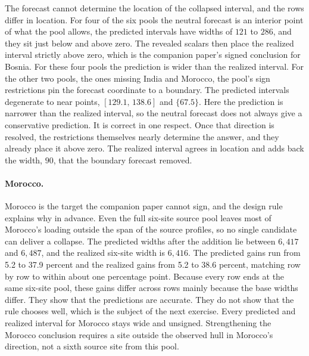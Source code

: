 The forecast cannot determine the location of the collapsed interval,
and the rows differ in location. For four of the six pools the neutral
forecast is an interior point of what the pool allows, the predicted
intervals have widths of $121$ to $286$, and they sit just below and
above zero. The revealed scalars then place the realized interval
strictly above zero, which is the companion paper's signed conclusion
for Bosnia. For these four pools the prediction is wider than the
realized interval. For the other two pools, the ones missing India and
Morocco, the pool's sign restrictions pin the forecast coordinate to a
boundary. The predicted intervals degenerate to near points,
$[129.1,\,138.6]$ and $\{67.5\}$. Here the prediction is narrower than
the realized interval, so the neutral forecast does not always give a
conservative prediction. It is correct in one respect. Once that
direction is resolved, the restrictions themselves nearly determine the
answer, and they already place it above zero. The realized interval
agrees in location and adds back the width, $90$, that the boundary
forecast removed.

\paragraph{Morocco.}
Morocco is the target the companion paper cannot sign, and the design
rule explains why in advance. Even the full six-site source pool leaves
most of Morocco's loading outside the span of the source profiles, so no
single candidate can deliver a collapse. The predicted widths after the
addition lie between $6{,}417$ and $6{,}487$, and the realized six-site
width is $6{,}416$. The predicted gains run from 5.2 to 37.9 percent and
the realized gains from 5.2 to 38.6 percent, matching row by row to
within about one percentage point. Because every row ends at the same
six-site pool, these gains differ across rows mainly because the base
widths differ. They show that the predictions are accurate. They do not
show that the rule chooses well, which is the subject of the next
exercise. Every predicted and realized interval for Morocco stays wide
and unsigned. Strengthening the Morocco conclusion requires a site
outside the observed hull in Morocco's direction, not a sixth source
site from this pool.

